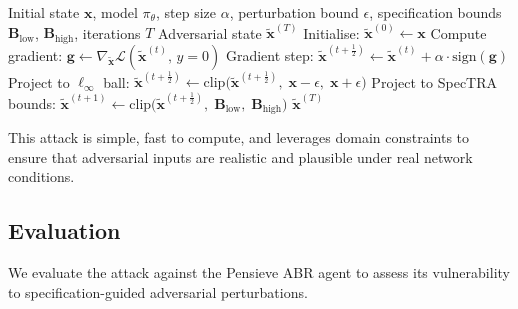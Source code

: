 \documentclass[thesis]{uofithesis} %
\begin{document}
    \begin{algorithm}[t]
        \caption{SpecTRA-Constrained PGD Attack}
        \label{alg:pgd-attack}
        \begin{algorithmic}[1]
            \Require Initial state $\mathbf{x}$, model $\pi_\theta$, step
                    size $\alpha$, perturbation bound $\epsilon$,
                    specification bounds $\mathbf{B}_{\text{low}}$,
                    $\mathbf{B}_{\text{high}}$, iterations $T$
            \Ensure  Adversarial state $\tilde{\mathbf{x}}^{(T)}$
            \State Initialise: $\tilde{\mathbf{x}}^{(0)} \gets \mathbf{x}$
                \State Compute gradient:
                    $\mathbf{g} \gets \nabla_{\tilde{\mathbf{x}}}
                        \mathcal{L}(\tilde{\mathbf{x}}^{(t)},\, y = 0)$
                \State Gradient step:
                    $\tilde{\mathbf{x}}^{(t+\frac{1}{2})} \gets
                        \tilde{\mathbf{x}}^{(t)} + \alpha \cdot
                        \mathrm{sign}(\mathbf{g})$
                \State Project to $\ell_\infty$ ball:
                    $\tilde{\mathbf{x}}^{(t+\frac{1}{2})} \gets
                        \mathrm{clip}\bigl(
                        \tilde{\mathbf{x}}^{(t+\frac{1}{2})},\;
                        \mathbf{x} - \epsilon,\;
                        \mathbf{x} + \epsilon\bigr)$
                \State Project to SpecTRA bounds:
                    $\tilde{\mathbf{x}}^{(t+1)} \gets
                        \mathrm{clip}\bigl(
                        \tilde{\mathbf{x}}^{(t+\frac{1}{2})},\;
                        \mathbf{B}_{\text{low}},\;
                        \mathbf{B}_{\text{high}}\bigr)$
            \EndFor
            \State \Return $\tilde{\mathbf{x}}^{(T)}$
        \end{algorithmic}
    \end{algorithm}
    
    This attack is simple, fast to compute, and leverages domain
    constraints to ensure that adversarial inputs are realistic and
    plausible under real network conditions.
    
    
    \subsection{Evaluation}
    \label{sec:attack-eval}
    
    We evaluate the attack against the Pensieve ABR agent to assess its
    vulnerability to specification-guided adversarial perturbations.
    
\end{document}
